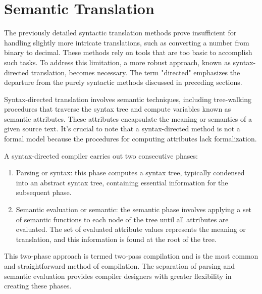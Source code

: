 \section{Semantic Translation}

The previously detailed syntactic translation methods prove insufficient for handling slightly more intricate translations, such as converting a number from binary to decimal. 
These methods rely on tools that are too basic to accomplish such tasks. To address this limitation, a more robust approach, known as syntax-directed translation, becomes necessary. 
The term "directed" emphasizes the departure from the purely syntactic methods discussed in preceding sections.

Syntax-directed translation involves semantic techniques, including tree-walking procedures that traverse the syntax tree and compute variables known as semantic attributes. 
These attributes encapsulate the meaning or semantics of a given source text. 
It's crucial to note that a syntax-directed method is not a formal model because the procedures for computing attributes lack formalization.

A syntax-directed compiler carries out two consecutive phases:
\begin{enumerate}
    \item Parsing or syntax: this phase computes a syntax tree, typically condensed into an abstract syntax tree, containing essential information for the subsequent phase.
    \item Semantic evaluation or semantic: the semantic phase involves applying a set of semantic functions to each node of the tree until all attributes are evaluated. 
        The set of evaluated attribute values represents the meaning or translation, and this information is found at the root of the tree.
\end{enumerate}
This two-phase approach is termed two-pass compilation and is the most common and straightforward method of compilation. 
The separation of parsing and semantic evaluation provides compiler designers with greater flexibility in creating these phases.